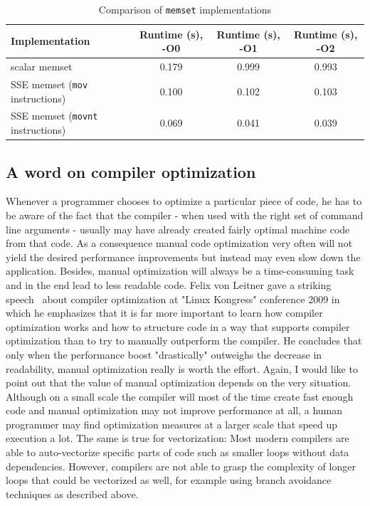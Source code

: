 \begin{table}[h]
\begin{center}
\begin{tabular}{lccc}
\toprule
Implementation & Runtime (s), -O0 & Runtime (s), -O1 & Runtime (s), -O2 \\
\midrule
scalar memset & 0.179 & 0.999 & 0.993 \\
SSE memset (\texttt{mov} instructions) & 0.100 & 0.102 & 0.103 \\
SSE memset (\texttt{movnt} instructions) & 0.069 & 0.041 & 0.039 \\
\bottomrule
\end{tabular}
\caption{Comparison of \texttt{memset} implementations}
\label{memset_table}
\end{center}
\end{table}

\subsection{A word on compiler optimization}
Whenever a programmer chooses to optimize a particular piece of code, he has to be aware of the fact that the compiler - when used with the right set of command line arguments - usually may have already created fairly optimal machine code from that code. As a consequence manual code optimization very often will not yield the desired performance improvements but instead may even slow down the application. Besides, manual optimization will always be a time-consuming task and in the end lead to less readable code. Felix von Leitner gave a striking speech~\cite{leitner2009} about compiler optimization at "Linux Kongress" conference 2009 in which he emphasizes that it is far more important to learn how compiler optimization works and how to structure code in a way that supports compiler optimization than to try to manually outperform the compiler. He concludes that only when the performance boost "drastically" outweighs the decrease in readability, manual optimization really is worth the effort. Again, I would like to point out that the value of manual optimization depends on the very situation. Although on a small scale the compiler will most of the time create fast enough code and manual optimization may not improve performance at all, a human programmer may find optimization measures at a larger scale that speed up execution a lot. The same is true for vectorization: Most modern compilers are able to auto-vectorize specific parts of code such as smaller loops without data dependencies. However, compilers are not able to grasp the complexity of longer loops that could be vectorized as well, for example using branch avoidance techniques as described above.